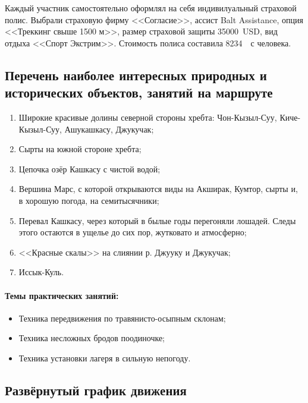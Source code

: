 Каждый участник самостоятельно оформлял на себя индивилуальный страховой полис. Выбрали страховую фирму <<Согласие>>, ассист Balt Assistance, опция <<Треккинг свыше 1500 м>>, размер страховой защиты 35000~USD,  вид отдыха <<Спорт Экстрим>>. Стоимость полиса составила 8234~\faRuble~с человека.


\subsection{Перечень наиболее интересных природных и исторических объектов, занятий на маршруте}
\begin{enumerate}[noitemsep,topsep=0pt,parsep=0pt,partopsep=0pt]
	
	\item Широкие красивые долины северной стороны хребта: Чон-Кызыл-Суу, Киче-Кызыл-Суу, Ашукашкасу, Джукучак;
	\item Сырты на южной стороне хребта;
	\item Цепочка озёр Кашкасу с чистой водой;
	\item Вершина Марс, с которой открываются виды на Акширак, Кумтор, сырты и, в хорошую погода, на семитысячники;
	\item Перевал Кашкасу, через который в былые годы перегоняли лошадей. Следы этого остаются в ущелье до сих пор, жутковато и атмосферно;
	\item <<Красные скалы>> на слиянии р. Джууку и Джукучак;
	\item Иссык-Куль.
\end{enumerate}

\paragraph{Темы практических занятий:}

\begin{itemize}
	\item Техника передвижения по травянисто-осыпным склонам;
	\item Техника несложных бродов поодиночке;
	\item Техника установки лагеря в сильную непогоду.
	
\end{itemize}

\newpage
\subsection{Развёрнутый график движения}


